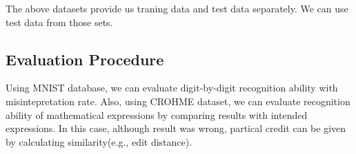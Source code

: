 \documentclass[10pt,twocolumn,letterpaper]{article}
\begin{document}
The above datasets provide us traning data and test data separately.
We can use test data from those sets.

\subsection{Evaluation Procedure}

Using MNIST database, we can evaluate digit-by-digit recognition ability with misintepretation rate. Also, using CROHME dataset, we can evaluate recognition ability of mathematical expressions by comparing results with intended expressions. In this case, although result was wrong, partical credit can be given by calculating similarity(e.g., edit distance).


{\small


}
\end{document}
